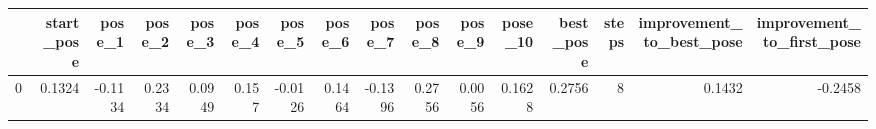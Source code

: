\begin{tabular}{lrrrrrrrrrrrrrrr}
\toprule
{} &  start\_pose &  pose\_1 &  pose\_2 &  pose\_3 &  pose\_4 &  pose\_5 &  pose\_6 &  pose\_7 &  pose\_8 &  pose\_9 &  pose\_10 &  best\_pose &  steps &  improvement\_to\_best\_pose &  improvement\_to\_first\_pose \\
\midrule
0 &      0.1324 & -0.1134 &  0.2334 &  0.0949 &   0.157 & -0.0126 &  0.1464 & -0.1396 &  0.2756 &  0.0056 &   0.1628 &     0.2756 &      8 &                    0.1432 &                    -0.2458 \\
\bottomrule
\end{tabular}
